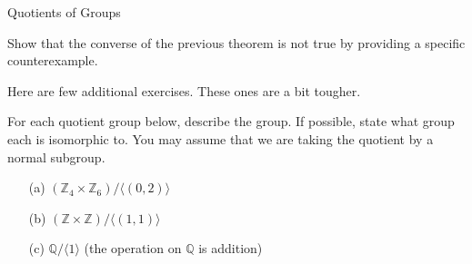\begin{section}{Quotients of Groups}
\begin{problem}
Show that the converse of the previous theorem is not true by providing a specific counterexample.
\end{problem}

Here are few additional exercises.  These ones are a bit tougher.

\begin{exercise}
For each quotient group below, describe the group.  If possible, state what group each is isomorphic to.  You may assume that we are taking the quotient by a normal subgroup. 
\begin{enumerate}
\item[(a)] $(\mathbb{Z}_4\times \mathbb{Z}_6)/\langle (0,2)\rangle$
\item[(b)] $(\mathbb{Z}\times \mathbb{Z})/\langle (1,1)\rangle$
\item[(c)] $\mathbb{Q}/\langle 1\rangle$ (the operation on $\mathbb{Q}$ is addition)
\end{enumerate}
\end{exercise}

\end{section}